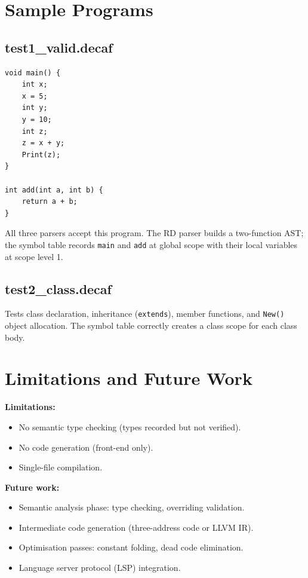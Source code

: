 \documentclass[12pt,a4paper]{article}
\begin{document}
\section{Sample Programs}

\subsection{test1\_valid.decaf}

\begin{lstlisting}[style=decaf]
void main() {
    int x;
    x = 5;
    int y;
    y = 10;
    int z;
    z = x + y;
    Print(z);
}

int add(int a, int b) {
    return a + b;
}
\end{lstlisting}

All three parsers accept this program. The RD parser builds a two-function AST;
the symbol table records \texttt{main} and \texttt{add} at global scope with their
local variables at scope level 1.

\subsection{test2\_class.decaf}

Tests class declaration, inheritance (\texttt{extends}), member functions, and
\texttt{New()} object allocation. The symbol table correctly creates a class scope
for each class body.

\section{Limitations and Future Work}

\textbf{Limitations:}
\begin{itemize}
  \item No semantic type checking (types recorded but not verified).
  \item No code generation (front-end only).
  \item Single-file compilation.
\end{itemize}

\textbf{Future work:}
\begin{itemize}
  \item Semantic analysis phase: type checking, overriding validation.
  \item Intermediate code generation (three-address code or LLVM IR).
  \item Optimisation passes: constant folding, dead code elimination.
  \item Language server protocol (LSP) integration.
\end{itemize}
\end{document}
